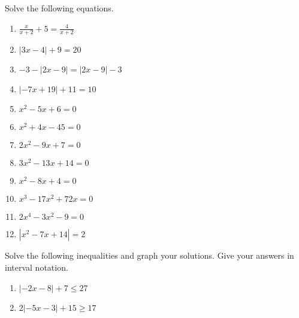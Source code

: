 \documentclass{article}
\begin{document}
\ReviewTitle[class={College Algebra}, for={Test 1}]

Solve the following equations.

\begin{enumerate}
\item $\displaystyle\frac{x}{x + 2} + 5 = \displaystyle\frac{4}{x + 2}$ \vspace{4cm}

\item $|3x - 4| + 9 = 20$ \vspace{4cm}

\item $-3 - |2x - 9| = |2x - 9| - 3$ \vspace{4cm}

\item $|-7x + 19| + 11 = 10$ \vspace{4cm}

\newpage

\item $x^2 - 5x + 6 = 0$

   \vspace{4cm}

\item $x^2 + 4x - 45 = 0$

   \vspace{4cm}

\item $2x^2 - 9x + 7 = 0$

   \vspace{4cm}

\item $3x^2 - 13x + 14 = 0$

   \vspace{4cm}

\item 

$x^2 - 8x + 4 = 0$

   \vspace{4cm}

\newpage

\item $x^3 - 17x^2 + 72x = 0$

   \vspace{4cm}

\item $2x^4 - 3x^2 - 9 = 0$

   \vspace{4cm}

\item $|x^2 - 7x + 14| = 2$

   \vspace{4cm}
\end{enumerate}

Solve the following inequalities and graph your solutions. Give your answers in interval notation.

\begin{enumerate}
\item $|-2x - 8| + 7 \leq 27$ \vspace{4cm}

\item $2|-5x - 3| + 15 \geq 17$
\end{enumerate}
\end{document}

